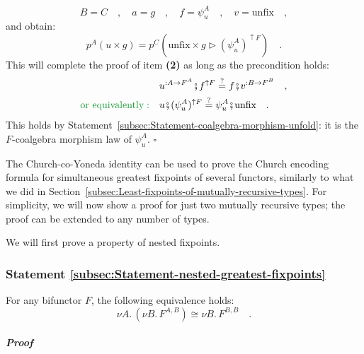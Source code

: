 \[
B=C\quad,\quad a=g\quad,\quad f=\psi_{u}^{A}\quad,\quad v=\text{unfix}\quad,
\]
and obtain:
\[
p^{A}(u\times g)=p^{C}(\text{unfix}\times g\triangleright(\psi_{u}^{A})^{\uparrow F})\quad.
\]
This will complete the proof of item \textbf{(2)} as long as the precondition
holds:
\begin{align*}
 & u^{:A\rightarrow F^{A}}\bef f^{\uparrow F}\overset{?}{=}f\bef v^{:B\rightarrow F^{B}}\quad,\\
{\color{greenunder}\text{or equivalently}:}\quad & u\bef(\psi_{u}^{A})^{\uparrow F}\overset{?}{=}\psi_{u}^{A}\bef\text{unfix}\quad.
\end{align*}
This holds by Statement~\ref{subsec:Statement-coalgebra-morphism-unfold}:
it is the $F$-coalgebra morphism law of $\psi_{u}^{A}$. $\square$

The Church-co-Yoneda identity can be used to prove the Church encoding
formula for simultaneous greatest fixpoints of several functors, similarly
to what we did in Section~\ref{subsec:Least-fixpoints-of-mutually-recursive-types}.
For simplicity, we will now show a proof for just two mutually recursive
types; the proof can be extended to any number of types. 

We will first prove a property of nested fixpoints.

\subsubsection{Statement \label{subsec:Statement-nested-greatest-fixpoints}\ref{subsec:Statement-nested-greatest-fixpoints}}

For any bifunctor $F$, the following equivalence holds:
\[
\nu A.\,(\nu B.\,F^{A,B})\cong\nu B.\,F^{B,B}\quad.
\]


\subparagraph{Proof}


